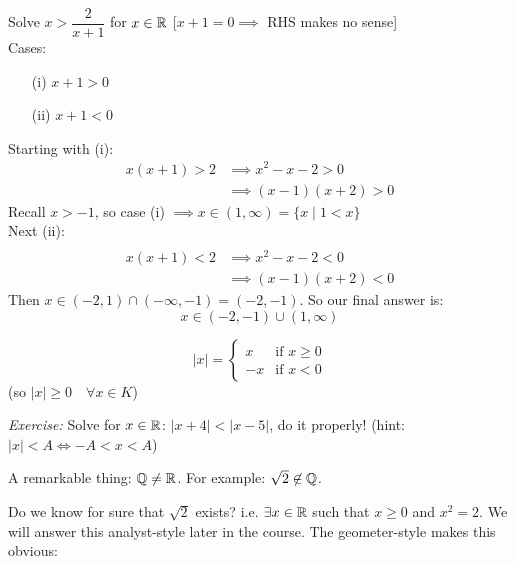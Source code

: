 \documentclass[10pt]{scrartcl}
\begin{document}
\begin{example}
Solve $x > \dfrac{2}{x+1}$ for $x \in \mathbb{R}$ [$x + 1 = 0 \implies$ RHS makes no sense] \\

Cases: \begin{enumerate}
 \item[(i)]$x + 1 > 0$ 
 \item[(ii)] $x+1<0$ 
 \end{enumerate}

 Starting with (i):
\begin{align*}
   x(x+1) > 2 &\implies x^2 - x - 2 >0\\
   &\implies (x-1)(x+2)>0
\end{align*}
 Recall $x > -1$, so case (i) $\implies x \in (1,\infty) = \{x \;|\; 1 < x\}$\\
 
 Next (ii):
\begin{align*}\\[-1cm]
   x(x+1) <2 &\implies x^2 - x - 2 < 0\\
   & \implies (x-1)(x+2) < 0
\end{align*}
 Then $x \in (-2,1) \cap (-\infty,-1) = (-2,-1)$. So our final answer is:
\[x \in (-2,-1) \cup (1,\infty)\]
\end{example}\vspace*{10pt}


\begin{definition}
\[|x| = \begin{cases}
 x & \text{if } x \geq 0\\
 -x &\text{if } x < 0
 \end{cases}\]
 (so $|x| \geq 0\quad \forall x\in K$)
 \end{definition}

\emph{Exercise:} Solve for $x \in\mathbb{R}$: $|x+4| < |x-5|$, do it properly! (hint: $|x| < A \iff -A < x < A$)



A remarkable  thing: $\mathbb{Q} \neq \mathbb{R}$. For example: $\sqrt{2} \not\in \mathbb{Q}$. 

Do we know for sure that $\sqrt{2}$ exists? i.e. $\exists x \in\mathbb{R}$ such that $x \geq 0$ and $x^2 =2$. We will answer this analyst-style later in the course. The geometer-style makes this obvious: 
\begin{center}
\end{center}
\end{document}
